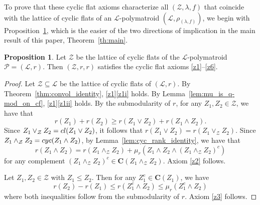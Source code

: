 \documentclass[a4paper,11pt,reqno]{article}
\newcommand\myup{\mathrel{\stackrel{\makebox[0pt]{\mbox{\normalfont\tiny up}}}{\sim}}}
\theoremstyle{definition}
\newtheorem{proposition}[theorem]{{{Proposition}}}
\newcommand{\mL}{\mathcal{L}}
\newcommand{\mP}{\mathcal{P}}
\newcommand{\mZ}{\mathcal{Z}}
\newcommand{\zero}{{\mathbf{0}}}
\begin{document}
To prove that these cyclic flat axioms characterize all $(\mathcal{Z},\lambda,f)$ that coincide with the lattice of cyclic flats of an $\mL$-polymatroid $(\mathcal{L},\rho_{(\lambda,f)})$, we begin with Proposition~\ref{prop:q-poly_sats_axioms}, which is the easier of the two directions of implication in the main result of this paper, Theorem~\ref{th:main}.

\begin{proposition}\label{prop:q-poly_sats_axioms}
    Let $\mathcal{Z}$ be the lattice of cyclic flats of the $\mL$-polymatroid $\mP=(\mathcal{L},r)$. Then $(\mZ,r,r)$ satisfies the cyclic flat axioms \ref{z1}--\ref{z6}.
\end{proposition}

\begin{proof}
Let $\mathcal{Z}\subseteq\mathcal{L}$ be the lattice of cyclic flats of $(\mathcal{L},r)$. 
%
By Theorem~\ref{thm:convol_identity}, \ref{z1}\ref{z1i} holds. By Lemma~\ref{lem:mu_is_q-mod_on_cf}, \ref{z1}\ref{z1ii} holds.
%
By the submodularity of $r$, for any $Z_1,Z_2\in\mathcal{Z}$, we have that
    $$r(Z_1)+r(Z_2)\geq r(Z_1\vee Z_2)+r(Z_1\wedge Z_2).$$
    Since $Z_1\vee_\mathcal{Z}Z_2=\textup{cl}(Z_1\vee Z_2)$, it follows that $r(Z_1\vee Z_2)=r(Z_1\vee_\mathcal{Z}Z_2)$. Since $Z_1\wedge_\mathcal{Z}Z_2=\textup{cyc}(Z_1\wedge Z_2)$, by Lemma~\ref{lem:cyc_rank_identity}, we have that
    $$r(Z_1\wedge Z_2)=r(Z_1\wedge_\mathcal{Z}Z_2)+\mu_r(Z_1\wedge Z_2\wedge (Z_1\wedge_\mathcal{Z}Z_2)^c)$$ 
    for any complement $(Z_1\wedge_\mathcal{Z}Z_2)^c \in \mathbf{C}(Z_1\wedge_\mathcal{Z}Z_2)$. Axiom \ref{z2} follows.

    Let $Z_1,Z_2 \in \mathcal{Z}$ with $Z_1 \leq Z_2$. Then for any $Z_1^c \in \mathbf{C}(Z_1)$, we have %
        $$r(Z_2)-r(Z_1) \leq r(Z_1^c \wedge Z_2) \leq \mu_r(Z_1^c \wedge Z_2)$$
        where both inequalities follow from the submodularity of $r$. Axiom \ref{z3} follows.


\end{proof}
\end{document}
